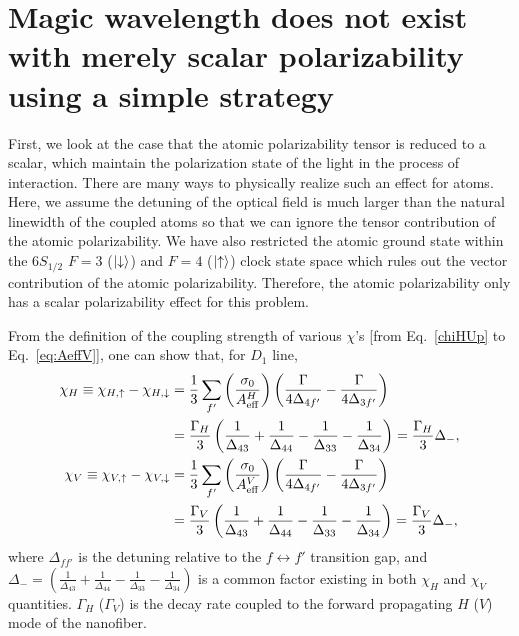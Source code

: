 \section{Magic wavelength does not exist with merely scalar polarizability using a simple strategy}
First, we look at the case that the atomic polarizability tensor is reduced to a scalar, which maintain the polarization state of the light in the process of interaction. There are many ways to physically realize such an effect for atoms. 
Here, we assume the detuning of the optical field is much larger than the natural linewidth of the 
coupled atoms so that we can ignore the tensor contribution of the atomic polarizability. We have also 
restricted the atomic ground state within the $ 6S_{1/2} $ $ F=3 $ ($ \lvert{\downarrow}\rangle $) and $ F=4 $ ($ 
\lvert{\uparrow}\rangle $) clock state space which rules out the vector contribution of 
the atomic polarizability. Therefore, the atomic polarizability only has a scalar polarizability effect for this problem. 

From the definition of the coupling strength of various $ \chi $'s [from Eq.~\eqref{chiHUp} to Eq.~\eqref{eq:AeffV}], one can show that, for $ D_1 $ line, 
\begin{align}
\chi_H \equiv \chi_{H,\uparrow} - \chi_{H,\downarrow} &= \frac{1}{3}\sum_{f'} \left(\frac{\sigma_0}{A_{\rm eff}^H} \right) \left(\frac{\Gamma}{4\Delta_{4f'}} - \frac{\Gamma}{4\Delta_{3f'}} \right) \nonumber\\
&= \frac{\Gamma_H}{3} \left(\frac{1}{\Delta_{43}}+\frac{1}{\Delta_{44}} - \frac{1}{\Delta_{33}}-\frac{1}{\Delta_{34}} \right) = \frac{\Gamma_H}{3}\Delta_-,\label{eq:chiH}\\
\chi_V \equiv \chi_{V,\uparrow} - \chi_{V,\downarrow} &= \frac{1}{3}\sum_{f'} \left(\frac{\sigma_0}{A_{\rm eff}^V} \right) \left(\frac{\Gamma}{4\Delta_{4f'}} - \frac{\Gamma}{4\Delta_{3f'}} \right) \nonumber\\
&= \frac{\Gamma_V}{3} \left(\frac{1}{\Delta_{43}}+\frac{1}{\Delta_{44}} - \frac{1}{\Delta_{33}}-\frac{1}{\Delta_{34}} \right)=\frac{\Gamma_V}{3}\Delta_-,\label{eq:chiV}
\end{align}
where $ \Delta_{ff'} $ is the detuning relative to the $ f\leftrightarrow f' $ transition gap, and $ \Delta_- = \left(\frac{1}{\Delta_{43}}+\frac{1}{\Delta_{44}} - \frac{1}{\Delta_{33}}-\frac{1}{\Delta_{34}} \right) $ is a common factor existing in both $ \chi_H $ and $ \chi_V $ quantities. $ \Gamma_H $ ($ \Gamma_V $) is the decay rate coupled to the forward propagating $ H $ ($ V $) mode of the nanofiber. 

